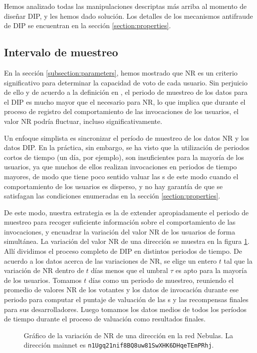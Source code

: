   Hemos analizado todas las manipulaciones descriptas más arriba al momento de diseñar DIP, y les hemos dado solución. Los detalles de los mecanismos antifraude de DIP se encuentran en la sección \ref{section:properties}.

  \subsection{Intervalo de muestreo}
  \label{subsection:interval}
  \noindent
  En la sección \ref{subsection:parameters}, hemos mostrado que NR es un criterio significativo para determinar la capacidad de voto de cada usuario. Sin perjuicio de ello y de acuerdo a la definición en \cite{Nebulasyellowpaper}, el periodo de muestreo de los datos para el DIP es mucho mayor que el necesario para NR, lo que implica que durante el proceso de registro del comportamiento de las invocaciones de los usuarios, el valor NR podría fluctuar, incluso significativamente.

  Un enfoque simplista es sincronizar el período de muestreo de los datos NR y los datos DIP. En la práctica, sin embargo, se ha visto que la utilización de periodos cortos de tiempo (un día, por ejemplo), son insuficientes para la mayoría de los usuarios, ya que muchos de ellos realizan invocaciones en periodos de tiempo mayores, de modo que tiene poco sentido valuar las {\dapp}s de este modo cuando el comportamiento de los usuarios es disperso, y no hay garantía de que se satisfagan las condiciones enumeradas en la sección \ref{section:properties}.

  De este modo, nuestra estrategia es la de extender apropiadamente el periodo de muestreo para recoger suficiente información sobre el comportamiento de las invocaciones, y encuadrar la variación del valor NR de los usuarios de forma simultánea. La variación del valor NR de una dirección se muestra en la figura \ref{fig:nr}. Allí dividimos el proceso completo de DIP en distintos periodos de tiempo. De acuerdo a los datos acerca de las variaciones de NR, se elige un entero $t$ tal que la variación de NR dentro de $t$ días menos que el umbral $\tau$ es apto para la mayoría de los usuarios. Tomamos $t$ días como un periodo de muestreo, reuniendo el promedio de valores NR de los votantes y los datos de invocación durante ese periodo para computar el puntaje de valuación de las {\dapp}s y las recompensas finales para sus desarrolladores. Luego tomamos los datos medios de todos los períodos de tiempo durante el proceso de valuación como resultados finales.

  \begin{figure}
  	\centering
  	

  	\caption{\label{fig:nr} Gráfico de la variación de NR de una dirección en la red Nebulas. La dirección mainnet es \texttt{n1Ugq21nif8BQ8uw81SwXHK6DHqeTEmPRhj}.}
  \end{figure}